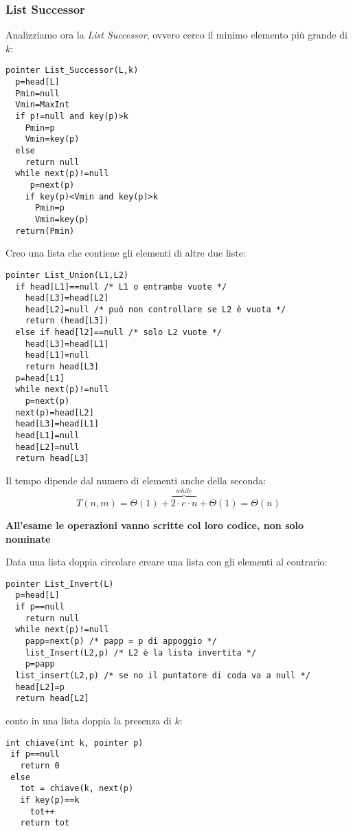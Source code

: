 \documentclass[a4paper,12pt,oneside,tikz]{book}
\begin{document}
\subsubsection{List Successor}
Analizziamo ora la \textit{List Successor}, ovvero cerco il minimo elemento più grande di $k$:
\begin{verbatim}
pointer List_Successor(L,k)
  p=head[L]
  Pmin=null
  Vmin=MaxInt
  if p!=null and key(p)>k
    Pmin=p
    Vmin=key(p)
  else
    return null
  while next(p)!=null
     p=next(p)
    if key(p)<Vmin and key(p)>k
      Pmin=p
      Vmin=key(p)
  return(Pmin)
\end{verbatim}
\begin{esercizio}
	Creo una lista che contiene gli elementi di altre due liste:
	\begin{verbatim}
pointer List_Union(L1,L2)
  if head[L1]==null /* L1 o entrambe vuote */
    head[L3]=head[L2]
    head[L2]=null /* può non controllare se L2 è vuota */
    return (head[L3])
  else if head[l2]==null /* solo L2 vuote */ 
    head[L3]=head[L1]
    head[L1]=null
    return head[L3]
  p=head[L1]
  while next(p)!=null
    p=next(p)
  next(p)=head[L2]
  head[L3]=head[L1]
  head[L1]=null
  head[L2]=null
  return head[L3]
\end{verbatim}
	Il tempo dipende dal numero di elementi anche della seconda: $$T(n,m)=\Theta(1)+\overbrace{2\cdot c\cdot n}^{while}+\Theta(1)=\Theta(n)$$
\end{esercizio}
\textbf{All'esame le operazioni vanno scritte col loro codice, non solo nominate}
\begin{esercizio}

	Data una lista doppia circolare creare una lista con gli elementi al contrario:
	\begin{verbatim}
pointer List_Invert(L)
  p=head[L]
  if p==null
    return null
  while next(p)!=null
    papp=next(p) /* papp = p di appoggio */ 
    list_Insert(L2,p) /* L2 è la lista invertita */
    p=papp
  list_insert(L2,p) /* se no il puntatore di coda va a null */
  head[L2]=p
  return head[L2]
\end{verbatim}
\end{esercizio}
\begin{esercizio}
	conto in una lista doppia la presenza di $k$:
	\begin{verbatim}
int chiave(int k, pointer p)
 if p==null
   return 0
 else
   tot = chiave(k, next(p)
   if key(p)==k
     tot++
   return tot
\end{verbatim}
\end{esercizio}
\newpage
\end{document}
